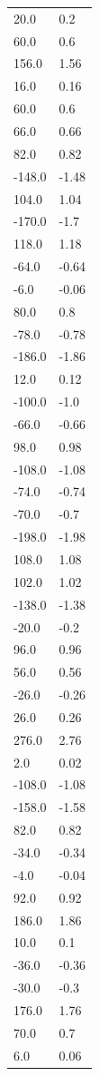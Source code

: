 \begin{longtable}{ll}
20.0 & 0.2 \\
60.0 & 0.6 \\
156.0 & 1.56 \\
16.0 & 0.16 \\
60.0 & 0.6 \\
66.0 & 0.66 \\
82.0 & 0.82 \\
-148.0 & -1.48 \\
104.0 & 1.04 \\
-170.0 & -1.7 \\
118.0 & 1.18 \\
-64.0 & -0.64 \\
-6.0 & -0.06 \\
80.0 & 0.8 \\
-78.0 & -0.78 \\
-186.0 & -1.86 \\
12.0 & 0.12 \\
-100.0 & -1.0 \\
-66.0 & -0.66 \\
98.0 & 0.98 \\
-108.0 & -1.08 \\
-74.0 & -0.74 \\
-70.0 & -0.7 \\
-198.0 & -1.98 \\
108.0 & 1.08 \\
102.0 & 1.02 \\
-138.0 & -1.38 \\
-20.0 & -0.2 \\
96.0 & 0.96 \\
56.0 & 0.56 \\
-26.0 & -0.26 \\
26.0 & 0.26 \\
276.0 & 2.76 \\
2.0 & 0.02 \\
-108.0 & -1.08 \\
-158.0 & -1.58 \\
82.0 & 0.82 \\
-34.0 & -0.34 \\
-4.0 & -0.04 \\
92.0 & 0.92 \\
186.0 & 1.86 \\
10.0 & 0.1 \\
-36.0 & -0.36 \\
-30.0 & -0.3 \\
176.0 & 1.76 \\
70.0 & 0.7 \\
6.0 & 0.06 \\

\end{longtable}
